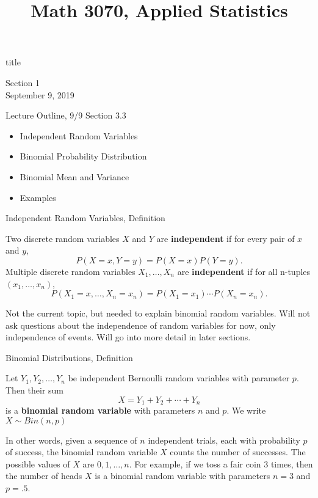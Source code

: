 \documentclass[handout]{beamer}
\title{Math 3070, Applied Statistics}
\newcommand{\nl}[1]{\vspace{#1 em}}
\begin{document}
\begin{frame}
    \begin{beamercolorbox}[rounded=true,wd=\textwidth,center]{title}
        \inserttitle
    \end{beamercolorbox}
    \begin{center}
        Section 1\\
        \nl{0.5}
        September 9, 2019
    \end{center}
\end{frame}

\begin{frame}{Lecture Outline, 9/9}
    Section 3.3
    \begin{itemize}
        \item Independent Random Variables
        \item Binomial Probability Distribution
        \item Binomial Mean and Variance
        \item Examples
    \end{itemize}
\end{frame}

\begin{frame}{Independent Random Variables, Definition}
    \begin{block}{}
        Two discrete random variables $X$ and $Y$ are \textbf{independent} if for every pair of $x$ and $y$,
        $$ P(X=x,Y=y) = P(X=x)P(Y=y). $$
        Multiple discrete random variables $X_1, \ldots, X_n$ are \textbf{independent} if for all n-tuples $(x_1,\ldots,x_n)$,
        $$ P(X_1=x,\ldots,X_n=x_n) = P(X_1=x_1)\cdots P(X_n=x_n). $$
    \end{block}
    Not the current topic, but needed to explain binomial random variables. Will not ask questions about the independence of random variables for now, only independence of events. Will go into more detail in later sections.
\end{frame}

\begin{frame}{Binomial Distributions, Definition}
    \begin{block}{}
    Let $Y_1, Y_2, \ldots, Y_n$ be independent Bernoulli random variables with parameter $p$. Then their sum
    $$X=Y_1+Y_2+\cdots+Y_n$$
    is a \textbf{binomial random variable} with parameters $n$ and $p$. We write $X\sim Bin(n,p)$
    \end{block}
    In other words, given a sequence of $n$ independent trials, each with probability $p$ of success,  the binomial random variable $X$ counts the number of successes. The possible values of $X$ are $0, 1, \ldots, n$.
    \vspace{.2cm}
    For example, if we toss a fair coin 3 times, then the number of heads $X$ is a binomial random variable with parameters $n=3$ and $p=.5$.
    \end{frame}
\end{document}
